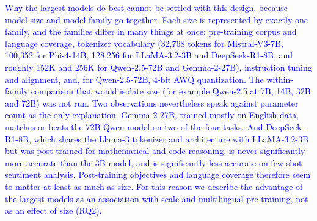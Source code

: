 \documentclass[10pt,letterpaper]{article}
\newcommand{\rev}[1]{\textcolor{blue}{#1}}
\begin{document}
\rev{Why the largest models do best cannot be settled with this design, because model size and model family go together. Each size is represented by exactly one family, and the families differ in many things at once: pre-training corpus and language coverage, tokenizer vocabulary (32,768 tokens for Mistral-V3-7B, 100,352 for Phi-4-14B, 128,256 for LLaMA-3.2-3B and DeepSeek-R1-8B, and roughly 152K and 256K for Qwen-2.5-72B and Gemma-2-27B), instruction tuning and alignment, and, for Qwen-2.5-72B, 4-bit AWQ quantization. The within-family comparison that would isolate size (for example Qwen-2.5 at 7B, 14B, 32B and 72B) was not run. Two observations nevertheless speak against parameter count as the only explanation. Gemma-2-27B, trained mostly on English data, matches or beats the 72B Qwen model on two of the four tasks. And DeepSeek-R1-8B, which shares the Llama-3 tokenizer and architecture with LLaMA-3.2-3B but was post-trained for mathematical and code reasoning, is never significantly more accurate than the 3B model, and is significantly less accurate on few-shot sentiment analysis. Post-training objectives and language coverage therefore seem to matter at least as much as size. For this reason we describe the advantage of the largest models as an association with scale and multilingual pre-training, not as an effect of size (RQ2).}
\end{document}

